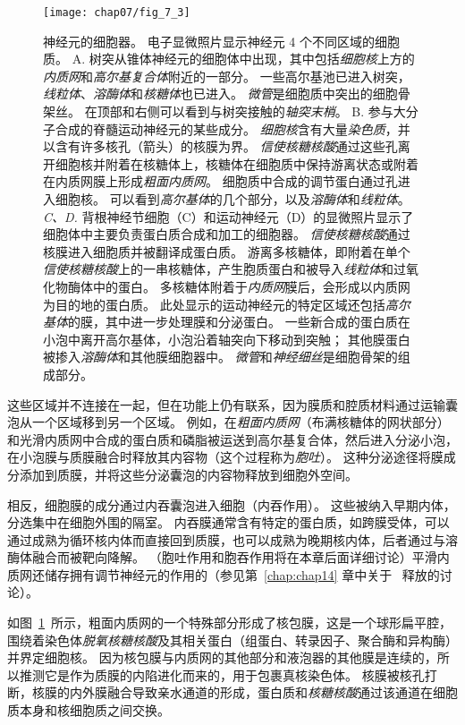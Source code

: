 \begin{figure}[htbp]
	\centering
	\texttt{[image: chap07/fig\_7\_3]}
	\caption{神经元的细胞器。
		电子显微照片显示神经元 4 个不同区域的细胞质\cite{peters1991neuropil}。
		A. 树突从锥体神经元的细胞体中出现，其中包括\textit{细胞核}上方的\textit{内质网}和\textit{高尔基复合体}附近的一部分。
		一些高尔基池已进入树突，\textit{线粒体}、\textit{溶酶体}和\textit{核糖体}也已进入。
		\textit{微管}是细胞质中突出的细胞骨架丝。
		在顶部和右侧可以看到与树突接触的\textit{轴突末梢}。
		B. 参与大分子合成的脊髓运动神经元的某些成分。
		\textit{细胞核}含有大量\textit{染色质}，并以含有许多核孔（箭头）的核膜为界。
		\textit{信使核糖核酸}通过这些孔离开细胞核并附着在核糖体上，核糖体在细胞质中保持游离状态或附着在内质网膜上形成\textit{粗面内质网}。
		细胞质中合成的调节蛋白通过孔进入细胞核。
		可以看到\textit{高尔基体}的几个部分，以及\textit{溶酶体}和\textit{线粒体}。
		\textit{C、D.} 背根神经节细胞（C）和运动神经元（D）的显微照片显示了细胞体中主要负责蛋白质合成和加工的细胞器。
		\textit{信使核糖核酸}通过核膜进入细胞质并被翻译成蛋白质。
		游离多核糖体，即附着在单个\textit{信使核糖核酸}上的一串核糖体，产生胞质蛋白和被导入\textit{线粒体}和过氧化物酶体中的蛋白。
		多核糖体附着于\textit{内质网}膜后，会形成以内质网为目的地的蛋白质。
		此处显示的运动神经元的特定区域还包括\textit{高尔基体}的膜，其中进一步处理膜和分泌蛋白。
		一些新合成的蛋白质在小泡中离开高尔基体，小泡沿着轴突向下移动到突触；
		其他膜蛋白被掺入\textit{溶酶体}和其他膜细胞器中。
		\textit{微管}和\textit{神经细丝}是细胞骨架的组成部分。}
	\label{fig:7_3}
\end{figure}


这些区域并不连接在一起，但在功能上仍有联系，因为膜质和腔质材料通过运输囊泡从一个区域移到另一个区域。
例如，在\textit{粗面内质网}（布满核糖体的网状部分）和光滑内质网中合成的蛋白质和磷脂被运送到高尔基复合体，然后进入分泌小泡，在小泡膜与质膜融合时释放其内容物（这个过程称为\textit{胞吐}）。
这种分泌途径将膜成分添加到质膜，并将这些分泌囊泡的内容物释放到细胞外空间。


相反，细胞膜的成分通过内吞囊泡进入细胞（内吞作用）。
这些被纳入早期内体，分选集中在细胞外围的隔室。
内吞膜通常含有特定的蛋白质，如跨膜受体，可以通过成熟为循环核内体而直接回到质膜，也可以成熟为晚期核内体，后者通过与溶酶体融合而被靶向降解。
（胞吐作用和胞吞作用将在本章后面详细讨论）平滑内质网还储存拥有调节神经元的作用的（参见第~\ref{chap:chap14} 章中关于~ 释放的讨论）。


如图~\ref{fig:7_3}~所示，粗面内质网的一个特殊部分形成了核包膜，这是一个球形扁平腔，围绕着染色体\textit{脱氧核糖核酸}及其相关蛋白（组蛋白、转录因子、聚合酶和异构酶）并界定细胞核。
因为核包膜与内质网的其他部分和液泡器的其他膜是连续的，所以推测它是作为质膜的内陷进化而来的，用于包裹真核染色体。
核膜被核孔打断，核膜的内外膜融合导致亲水通道的形成，蛋白质和\textit{核糖核酸}通过该通道在细胞质本身和核细胞质之间交换。


